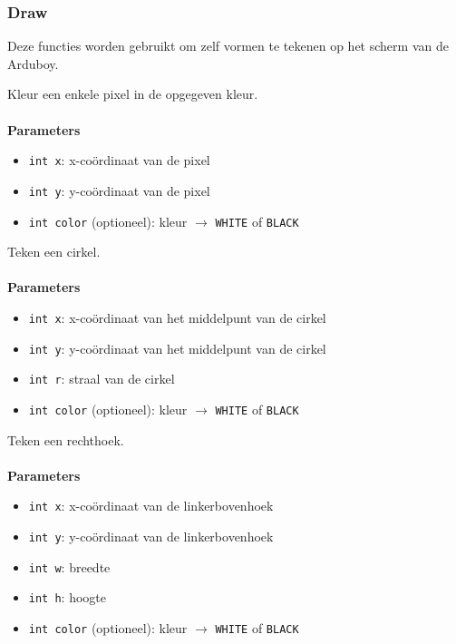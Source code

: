 \documentclass[11pt,fleqn]{book} %
\begin{document}
\subsubsection{Draw}
Deze functies worden gebruikt om zelf vormen te tekenen op het scherm van de Arduboy.

\begin{libf}[drawPixel(x, y, \emph{color=WHITE})]
	Kleur een enkele pixel in de opgegeven kleur.\\ \\
	\textbf{Parameters}
	\begin{itemize}
		\item \texttt{int x}: x-coördinaat van de pixel
		\item \texttt{int y}: y-coördinaat van de pixel
		\item \texttt{int color} (optioneel): kleur $\rightarrow$ \texttt{WHITE} of \texttt{BLACK}
	\end{itemize}
\end{libf}

\begin{libf}[drawCircle(x, y, r, \emph{color=WHITE})]
	Teken een cirkel.\\ \\
	\textbf{Parameters}
	\begin{itemize}
		\item \texttt{int x}: x-coördinaat van het middelpunt van de cirkel
		\item \texttt{int y}: y-coördinaat van het middelpunt van de cirkel
		\item \texttt{int r}: straal van de cirkel
		\item \texttt{int color} (optioneel): kleur $\rightarrow$ \texttt{WHITE} of \texttt{BLACK}
	\end{itemize}
\end{libf}

\begin{libf}[drawRect(x, y, w, h, \emph{color=WHITE})]
	Teken een rechthoek.\\ \\
	\textbf{Parameters}
	\begin{itemize}
		\item \texttt{int x}: x-coördinaat van de linkerbovenhoek
		\item \texttt{int y}: y-coördinaat van de linkerbovenhoek
		\item \texttt{int w}: breedte
		\item \texttt{int h}: hoogte
		\item \texttt{int color} (optioneel): kleur $\rightarrow$ \texttt{WHITE} of \texttt{BLACK}
	\end{itemize}
\end{libf}
\end{document}
